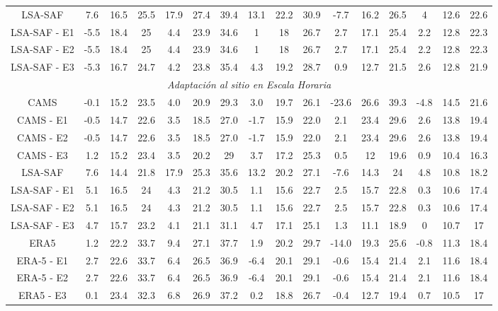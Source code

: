 \begin{table}
{\begin{tabular}{cccccccccccccccc}
\hline
LSA-SAF      & 7.6  & 16.5 & 25.5 & 17.9 & 27.4  & 39.4 & 13.1& 22.2 & 30.9  & -7.7 & 16.2 & 26.5 & 4   & 12.6 & 22.6 \\
LSA-SAF - E1 & -5.5 & 18.4 & 25   & 4.4  & 23.9  & 34.6 & 1   & 18   & 26.7  &  2.7 & 17.1 & 25.4 & 2.2 & 12.8 & 22.3 \\
LSA-SAF - E2 & -5.5 & 18.4 & 25   & 4.4  & 23.9  & 34.6 & 1   & 18   & 26.7  &  2.7 & 17.1 & 25.4 & 2.2 & 12.8 & 22.3 \\
LSA-SAF - E3 & -5.3 & 16.7 & 24.7 & 4.2  & 23.8  & 35.4 & 4.3 & 19.2 & 28.7  &  0.9 & 12.7 & 21.5 & 2.6 & 12.8 & 21.9 \\

\hline
\multicolumn{16}{|c|}{\textit{Adaptación al sitio en Escala Horaria}} \\
\hline
CAMS           & -0.1 & 15.2 & 23.5 & 4.0 & 20.9  & 29.3 & 3.0  & 19.7  & 26.1 & -23.6 & 26.6 & 39.3 & -4.8 & 14.5 & 21.6 \\
CAMS  - E1    &  -0.5 & 14.7 & 22.6 &  3.5 & 18.5 & 27.0 & -1.7 & 15.9 & 22.0  &  2.1 & 23.4  & 29.6 &  2.6 & 13.8 & 19.4 \\
CAMS  - E2    &  -0.5 & 14.7 & 22.6 &  3.5 & 18.5 & 27.0 & -1.7 & 15.9 & 22.0  &  2.1 & 23.4  & 29.6 &  2.6 & 13.8 & 19.4 \\
CAMS  - E3    &  1.2 & 15.2  & 23.4 &  3.5 & 20.2 & 29   & 3.7  & 17.2  & 25.3 &  0.5 & 12    & 19.6 &  0.9 & 10.4 & 16.3 \\
\hline
LSA-SAF      & 7.6  & 14.4 & 21.8  & 17.9 & 25.3   & 35.6 & 13.2 & 20.2 & 27.1 & -7.6 & 14.3 & 24 & 4.8 & 10.8 & 18.2 \\
LSA-SAF - E1 & 5.1  & 16.5 & 24    & 4.3 & 21.2 & 30.5 & 1.1 & 15.6 & 22.7 &   2.5 & 15.7 & 22.8 &  0.3 & 10.6 & 17.4 \\
LSA-SAF - E2 & 5.1  & 16.5 & 24    & 4.3 & 21.2 & 30.5 & 1.1 & 15.6 & 22.7 &   2.5 & 15.7 & 22.8 &  0.3 & 10.6 & 17.4 \\
LSA-SAF - E3 & 4.7  & 15.7 & 23.2  & 4.1 & 21.1 & 31.1 & 4.7 & 17.1 & 25.1 &   1.3 & 11.1 & 18.9 &   0  & 10.7 & 17 \\
\hline
ERA5         & 1.2  & 22.2 & 33.7 & 9.4 & 27.1 & 37.7 & 1.9  & 20.2 & 29.7 & -14.0 & 19.3 & 25.6 & -0.8  & 11.3 & 18.4 \\
ERA-5 - E1   & 2.7  & 22.6 & 33.7 & 6.4 & 26.5 & 36.9 & -6.4 & 20.1 & 29.1 & -0.6  & 15.4 & 21.4 &  2.1  & 11.6 & 18.4 \\
ERA-5 - E2   & 2.7  & 22.6 & 33.7 & 6.4 & 26.5 & 36.9 & -6.4 & 20.1 & 29.1 & -0.6  & 15.4 & 21.4 &  2.1  & 11.6 & 18.4 \\
ERA5  - E3   & 0.1  & 23.4 & 32.3 & 6.8 & 26.9 & 37.2 & 0.2  & 18.8 & 26.7 & -0.4  & 12.7 & 19.4 &   0.7 & 10.5 & 17 \\


\end{tabular}}
\end{table}
